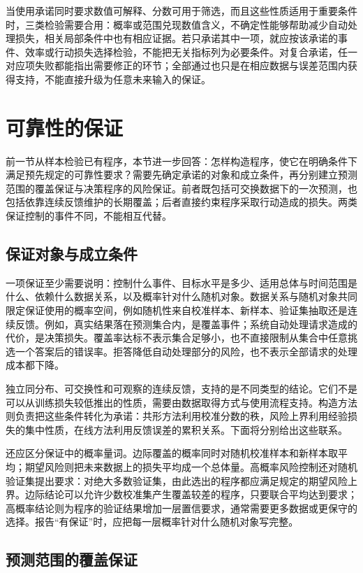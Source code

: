 当使用承诺同时要求数值可解释、分数可用于筛选，而且这些性质适用于重要条件时，三类检验需要合用：概率或范围兑现数值含义，不确定性能够帮助减少自动处理损失，相关局部条件中也有相应证据。若只承诺其中一项，就应按该承诺的事件、效率或行动损失选择检验，不能把无关指标列为必要条件。对复合承诺，任一对应项失败都能指出需要修正的环节；全部通过也只是在相应数据与误差范围内获得支持，不能直接升级为任意未来输入的保证。

\section{可靠性的保证}
\label{sec:reliability-guarantee}

前一节从样本检验已有程序，本节进一步回答：怎样构造程序，使它在明确条件下满足预先规定的可靠性要求？需要先确定承诺的对象和成立条件，再分别建立预测范围的覆盖保证与决策程序的风险保证。前者既包括可交换数据下的一次预测，也包括依靠连续反馈维护的长期覆盖；后者直接约束程序采取行动造成的损失。两类保证控制的事件不同，不能相互代替。

\subsection{保证对象与成立条件}

一项保证至少需要说明：控制什么事件、目标水平是多少、适用总体与时间范围是什么、依赖什么数据关系，以及概率针对什么随机对象。数据关系与随机对象共同限定保证使用的概率空间，例如随机性来自校准样本、新样本、验证集抽取还是连续反馈。例如，真实结果落在预测集合内，是覆盖事件；系统自动处理请求造成的代价，是决策损失。覆盖率达标不表示集合足够小，也不直接限制从集合中任意挑选一个答案后的错误率。拒答降低自动处理部分的风险，也不表示全部请求的处理成本都下降。

独立同分布、可交换性和可观察的连续反馈，支持的是不同类型的结论。它们不是可以从训练损失较低推出的性质，需要由数据取得方式与使用流程支持。构造方法则负责把这些条件转化为承诺：共形方法利用校准分数的秩，风险上界利用经验损失的集中性质，在线方法利用反馈误差的累积关系。下面将分别给出这些联系。

还应区分保证中的概率量词。边际覆盖的概率同时对随机校准样本和新样本取平均；期望风险则把未来数据上的损失平均成一个总体量。高概率风险控制还对随机验证集提出要求：对绝大多数验证集，由此选出的程序都应满足规定的期望风险上界。边际结论可以允许少数校准集产生覆盖较差的程序，只要联合平均达到要求；高概率结论则为程序的验证结果增加一层置信要求，通常需要更多数据或更保守的选择。报告“有保证”时，应把每一层概率针对什么随机对象写完整。

\subsection{预测范围的覆盖保证}

